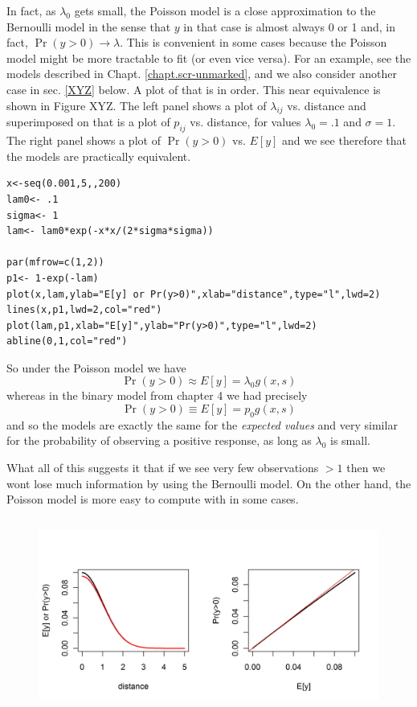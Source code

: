 In fact, as $\lambda_0$ gets small, the Poisson model is a close approximation
to the Bernoulli model in the sense that $y$ in that case is almost
always 0 or 1 and, in fact, $\Pr(y>0) \rightarrow \lambda$.  This is
convenient in some cases because the Poisson model might be more
tractable to fit (or even vice versa). For an example, see the models
described in Chapt. \ref{chapt.scr-unmarked}, and we also consider
another case in sec. \ref{XYZ} below.
A plot of that is in order. This near equivalence is shown in  Figure
XYZ. The left panel shows a plot of $\lambda_{ij}$ vs. distance and
superimposed on that is a plot of $p_{ij}$ vs. distance, for values
$\lambda_{0} = .1$ and $\sigma = 1$. The right panel shows a plot of
$\Pr(y>0)$ vs. $E[y]$ and we see therefore that the models are
practically equivalent. 

\begin{verbatim}
x<-seq(0.001,5,,200)
lam0<- .1
sigma<- 1
lam<- lam0*exp(-x*x/(2*sigma*sigma))

par(mfrow=c(1,2))
p1<- 1-exp(-lam)
plot(x,lam,ylab="E[y] or Pr(y>0)",xlab="distance",type="l",lwd=2)
lines(x,p1,lwd=2,col="red")
plot(lam,p1,xlab="E[y]",ylab="Pr(y>0)",type="l",lwd=2)
abline(0,1,col="red")
\end{verbatim}

So under the Poisson model we have
\[
\Pr(y>0) \approx E[y] = \lambda_{0} g(x,s)
\]
whereas in the binary model from chapter 4 we had precisely
\[
\Pr(y>0) \equiv E[y] = p_{0} g(x,s)
\]
and so the models are exactly the same for the {\it expected values}
and very similar for the probability of observing a positive response,
as long as $\lambda_{0}$ is small.


What all of this suggests it that
if we see very few observations $>1$ then we wont lose much
information by using the Bernoulli model. On the other hand, the
Poisson model is more easy to compute with in some cases. 


\begin{figure}
\centering
\includegraphics[width=5in,height=2.5in]{Ch5/figs/Poisson-Bern.png}
\label{fig:elevMap}
\end{figure}



